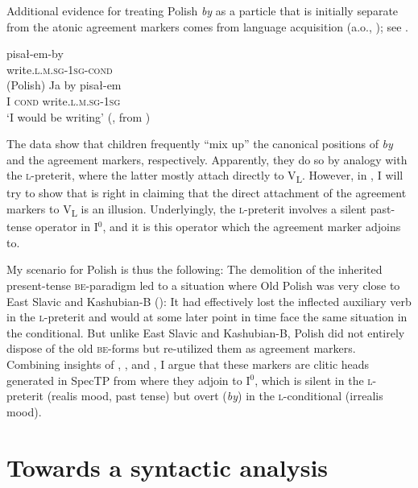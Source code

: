 \documentclass[output=paper]{langscibook}
\begin{document}
Additional evidence for treating Polish \textit{by} as a particle that is initially separate from the atonic agreement markers comes from language acquisition (a.o., \cites{Smoczynska1985}{Blaszczyk2018}{DogilAguado1989}); see .

\ea
\ea\gll pisał-em-by \\
write.\textsc{l.m.sg-1sg-cond} \\ \hfill (Polish)
\ex\gll Ja by pisał-em \\
I \textsc{cond} write.\textsc{l.m.sg-1sg} \\
\glt `I would be writing'  \hfill (\citealt[640]{Smoczynska1985}, from \citealt[118]{Blaszczyk2018}) 
\z
\label{pitsch:ex:LanguageAcquisition}
\z

\noindent The data show that children frequently ``mix up'' the canonical positions of \textit{by} and the agreement markers, respectively. Apparently, they do so by analogy with the \textsc{l-}preterit, where the latter mostly attach directly to V\textsubscript{L}. However, in , I will try to show that \citet{Embick1995} is right in claiming that the direct attachment of the agreement markers to V\textsubscript{L} is an illusion. Underlyingly, the \textsc{l-}preterit involves a silent past-tense operator in I$^0$, and it is this operator which the agreement marker adjoins to.

My scenario for Polish is thus the following: The demolition of the inherited present-tense \textsc{be}-paradigm led to a situation where Old Polish was very close to East Slavic and Kashubian-B (): It had effectively lost the inflected auxiliary verb in the \textsc{l-}preterit and would at some later point in time face the same situation in the conditional. But unlike East Slavic and Kashubian-B, Polish did not entirely dispose of the old \textsc{be}-forms but re-utilized them as agreement markers. Combining insights of \citet{Embick1995}, \citet{Matushansky2006}, and \citet{Pietraszko2018,Pietraszko2021}, I argue that these markers are clitic heads generated in SpecTP from where they adjoin to I$^0$, which is silent in the \textsc{l-}preterit (realis mood, past tense) but overt (\textit{by}) in the \textsc{l-}conditional (irrealis mood).


\section{Towards a syntactic analysis}\label{pitsch:sec:syntax}
\end{document}
